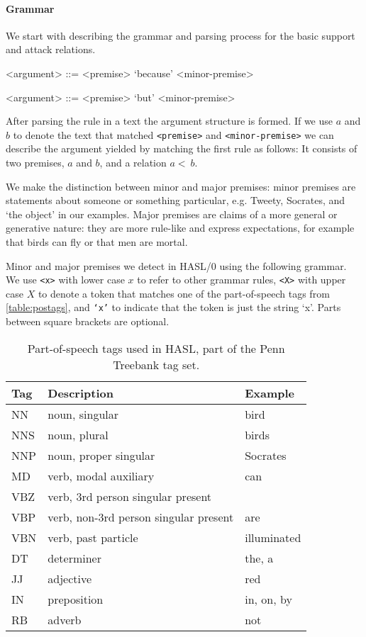 \paragraph{Grammar} We start with describing the grammar and parsing process for the basic support and attack relations.

\begin{grammar}
<argument> ::= <premise> `because' <minor-premise> %

<argument> ::= <premise> `but' <minor-premise> %
\end{grammar}

\noindent After parsing the rule in a text the argument structure is formed. If we use $a$ and $b$ to denote the text that matched \texttt{<premise>} and \texttt{<minor-premise>} we can describe the argument yielded by matching the first rule as follows: It consists of two premises, $a$ and $b$, and a relation $a <~ b$.

We make the distinction between minor and major premises: minor premises are statements about someone or something particular, e.g. Tweety, Socrates, and `the object' in our examples. Major premises are claims of a more general or generative nature: they are more rule-like and express expectations, for example that birds can fly or that men are mortal.

Minor and major premises we detect in HASL/0 using the following grammar. We use \texttt{<x>} with lower case $x$ to refer to other grammar rules, \texttt{<X>} with upper case $X$ to denote a token that matches one of the part-of-speech tags from \autoref{table:postags}, and \texttt{`x'} to indicate that the token is just the string `x'. Parts between square brackets are optional.

\begin{table}
    \begin{tabular}{lll}
        Tag & Description & Example \\
        \hline
        NN  & noun, singular & bird \\
        NNS & noun, plural & birds \\
        NNP & noun, proper singular & Socrates \\
        MD  & verb, modal auxiliary & can \\
        VBZ & verb, 3rd person singular present \\
        VBP & verb, non-3rd person singular present & are \\
        VBN & verb, past particle & illuminated \\
        DT  & determiner & the, a \\
        JJ  & adjective & red \\
        IN  & preposition & in, on, by \\
        RB  & adverb & not
    \end{tabular}
    \caption{Part-of-speech tags used in HASL, part of the Penn Treebank tag set.}
    \label{table:postags}
\end{table}


